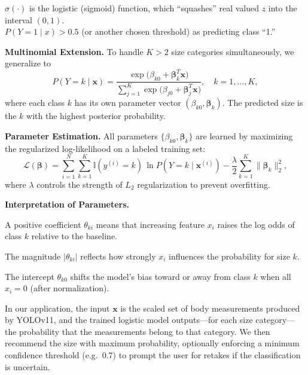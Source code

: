 \documentclass{llncs}
\begin{document}
$\sigma(\cdot)$ is the logistic (sigmoid) function, which ``squashes'' real valued $z$ into the interval $(0,1)$. \\

$P(Y = 1 \mid x) > 0.5$ (or another chosen threshold) as predicting class ``1.''


\textbf{Multinomial Extension.} To handle $K>2$ size categories simultaneously, we generalize to
\begin{equation}
P(Y=k \mid \mathbf{x}) = \frac{\exp\big(\beta_{k0} + \boldsymbol{\beta}_{k}^{T}\mathbf{x}\big)}{\displaystyle\sum_{j=1}^{K}\exp\big(\beta_{j0} + \boldsymbol{\beta}_{j}^{T}\mathbf{x}\big)}, \quad k = 1,\ldots,K,
\end{equation}
where each class $k$ has its own parameter vector $(\beta_{k0}, \boldsymbol{\beta}_{k})$. The predicted size is the $k$ with the highest posterior probability.

\textbf{Parameter Estimation.} All parameters $\{\beta_{k0},\boldsymbol{\beta}_{k}\}$ are learned by maximizing the regularized log-likelihood on a labeled training set:
\begin{equation}
\mathcal{L}(\boldsymbol{\beta}) = \sum_{i=1}^{N}\sum_{k=1}^{K} \mathbb{I}(y^{(i)}=k)\,\ln P(Y=k\mid \mathbf{x}^{(i)}) - \frac{\lambda}{2}\sum_{k=1}^{K}\|\boldsymbol{\beta}_{k}\|_{2}^{2},
\end{equation}
where $\lambda$ controls the strength of $L_{2}$ regularization to prevent overfitting.

\textbf{Interpretation of Parameters.}

\hspace*{2em} A positive coefficient $\theta_{ki}$ means that increasing feature $x_i$ raises the log odds of class $k$ relative to the baseline. 

\hspace*{2em} The magnitude $|\theta_{ki}|$ reflects how strongly $x_i$ influences the probability for size $k$. 

\hspace*{2em} The intercept $\theta_{k0}$ shifts the model’s bias toward or away from class $k$ when all $x_i = 0$ (after normalization).


In our application, the input $\mathbf{x}$ is the scaled set of body measurements produced by YOLOv11, and the trained logistic model outputs—for each size category—the probability that the measurements belong to that category. We then recommend the size with maximum probability, optionally enforcing a minimum confidence threshold (e.g.\ 0.7) to prompt the user for retakes if the classification is uncertain.
\end{document}
